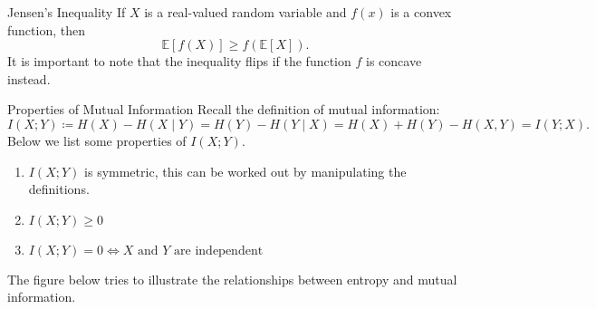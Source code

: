 \begin{thrm}{Jensen's Inequality}{}
If \(X\) is a real-valued random variable and \(f(x)\) is a convex function, then
\[
  \mathbb{E} \left[ f(X) \right] \geq f \left( \mathbb{E} [X] \right). 
\]
It is important to note that the inequality flips if the function \(f\) is concave instead. 
\end{thrm}

\begin{thrm}{Properties of Mutual Information}{}
Recall the definition of mutual information:
\[
  I(X;Y) \coloneqq H(X)- H(X \mid Y) = H(Y) - H(Y \mid X) = H(X)+ H(Y)- H(X,Y) = I(Y;X). 
\]
Below we list some  properties of \(I(X;Y)\). 
\begin{enumerate}
  \item \(I(X;Y)\) is symmetric, this can be worked out by manipulating the definitions. 
  \item \(I(X;Y) \geq 0\) 
  \item \(I(X;Y) = 0 \iff X \text{ and } Y \text{ are independent }  \) 
\end{enumerate}
\end{thrm}

The figure below tries to illustrate the relationships between entropy and mutual information.


